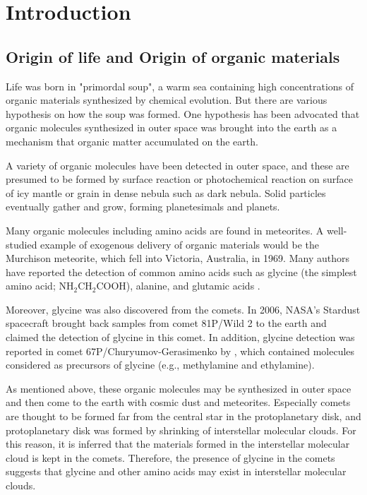 \chapter{Introduction
  \label{chap:introduction}}


\section{Origin of life and Origin of organic materials}
Life was born in "primordal soup", a warm sea containing high concentrations of organic materials synthesized by chemical evolution. But there are various hypothesis on how the soup was formed.
One hypothesis has been advocated that organic molecules synthesized in outer space 
was brought into the earth as a mechanism that organic matter accumulated on the earth.

A variety of organic molecules have been detected in outer space, and these are presumed 
to be formed by surface reaction or photochemical reaction on surface of icy mantle or grain 
in dense nebula such as dark nebula.
Solid particles eventually gather and grow, forming planetesimals and planets.

Many organic molecules including amino acids are found in meteorites.
A well-studied example of exogenous delivery of organic materials would
be the Murchison meteorite, which fell into Victoria, Australia, in 1969. 
Many authors have reported the detection of common amino acids such as glycine 
(the simplest amino acid; NH$_2$CH$_2$COOH), alanine, and glutamic acids \citep[e.g., ][]{Engel+Nagy1982}.

Moreover, glycine was also discovered from the comets. 
In 2006, NASA's Stardust spacecraft brought back samples from comet 81P/Wild 2 to the earth 
and \citet{Elsila+2009} claimed the detection of glycine in this comet.
In addition, glycine detection was reported in comet 67P/Churyumov-Gerasimenko by \citet{Altwegg+2016},
which contained molecules considered as precursors of glycine (e.g., methylamine and ethylamine).

As mentioned above, these organic molecules may be synthesized in outer space and then 
come to the earth with cosmic dust and meteorites.
Especially comets are thought to be formed far from the central star in the protoplanetary disk, 
and protoplanetary disk was formed by shrinking of interstellar molecular clouds. 
For this reason, it is inferred that the materials formed in the interstellar molecular cloud 
is kept in the comets.
Therefore, the presence of glycine in the comets suggests that glycine and other amino acids 
may exist in interstellar molecular clouds.


